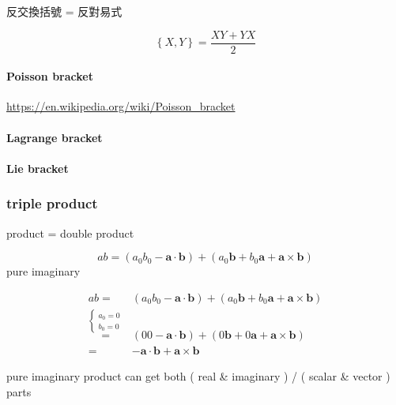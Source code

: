\documentclass[
]{book}
\theoremstyle{definition}
\theoremstyle{definition}
\theoremstyle{definition}
\theoremstyle{definition}
\theoremstyle{remark}
\begin{document}
\begin{CJK}{UTF8}{bsmi}
反交換括號 = 反對易式
\end{CJK}

\[
\left\{ X,Y\right\} =\dfrac{XY+YX}{2}
\]

\paragraph{Poisson bracket}\label{poisson-bracket}

\url{https://en.wikipedia.org/wiki/Poisson_bracket}

\paragraph{Lagrange bracket}\label{lagrange-bracket}

\paragraph{Lie bracket}\label{lie-bracket}

\subsubsection{triple product}\label{triple-product}

product = double product

\[
ab=\left(a_{{\scriptscriptstyle 0}}b_{{\scriptscriptstyle 0}}-\boldsymbol{a}\cdot\boldsymbol{b}\right)+\left(a_{{\scriptscriptstyle 0}}\boldsymbol{b}+b_{{\scriptscriptstyle 0}}\boldsymbol{a}+\boldsymbol{a}\times\boldsymbol{b}\right)
\]
pure imaginary

\[
\begin{aligned}
ab= & \left(a_{{\scriptscriptstyle 0}}b_{{\scriptscriptstyle 0}}-\boldsymbol{a}\cdot\boldsymbol{b}\right)+\left(a_{{\scriptscriptstyle 0}}\boldsymbol{b}+b_{{\scriptscriptstyle 0}}\boldsymbol{a}+\boldsymbol{a}\times\boldsymbol{b}\right)\\
\overset{\begin{cases}
a_{0}=0\\
b_{0}=0
\end{cases}}{=} & \left(00-\boldsymbol{a}\cdot\boldsymbol{b}\right)+\left(0\boldsymbol{b}+0\boldsymbol{a}+\boldsymbol{a}\times\boldsymbol{b}\right)\\
= & -\boldsymbol{a}\cdot\boldsymbol{b}+\boldsymbol{a}\times\boldsymbol{b}
\end{aligned}
\]

pure imaginary product can get both ( real \& imaginary ) / ( scalar \& vector ) parts
\end{document}
